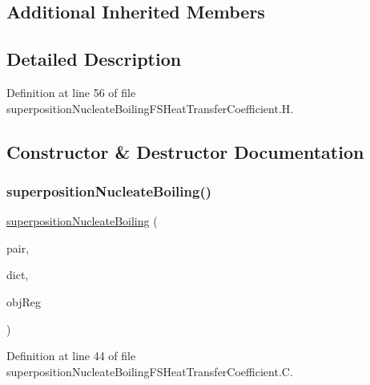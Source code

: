 \subsection*{Additional Inherited Members}


\subsection{Detailed Description}


Definition at line 56 of file superposition\+Nucleate\+Boiling\+F\+S\+Heat\+Transfer\+Coefficient.\+H.



\subsection{Constructor \& Destructor Documentation}
\mbox{\label{classFoam_1_1FSHeatTransferCoefficientModels_1_1superpositionNucleateBoiling_ab701e6b199209a111fd12a460e78dd8f}} 
\subsubsection{\texorpdfstring{superposition\+Nucleate\+Boiling()}{superpositionNucleateBoiling()}}
{\footnotesize\ttfamily \hyperlink{classFoam_1_1FSHeatTransferCoefficientModels_1_1superpositionNucleateBoiling}{superposition\+Nucleate\+Boiling} (\begin{DoxyParamCaption}\item[{const \hyperlink{classFoam_1_1FSPair}{F\+S\+Pair} \&}]{pair,  }\item[{const dictionary \&}]{dict,  }\item[{const object\+Registry \&}]{obj\+Reg }\end{DoxyParamCaption})}



Definition at line 44 of file superposition\+Nucleate\+Boiling\+F\+S\+Heat\+Transfer\+Coefficient.\+C.




